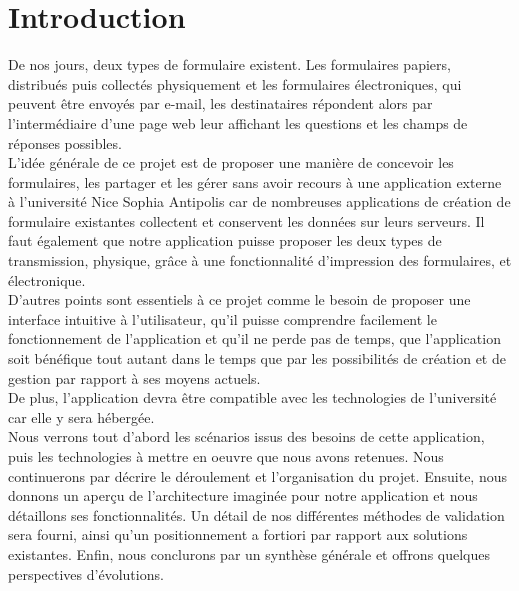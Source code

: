 \documentclass{sigplanconf}
\begin{document}
\section{Introduction}
De nos jours, deux types de formulaire existent. Les formulaires papiers, distribués puis collectés physiquement et les formulaires électroniques, qui peuvent être envoyés par e-mail, les destinataires répondent alors par l’intermédiaire d’une page web leur affichant les questions et les champs de réponses possibles.\\
L’idée générale de ce projet est de proposer une manière de concevoir les formulaires, les partager et les gérer sans avoir recours à une application externe à l’université Nice Sophia Antipolis car de nombreuses applications de création de formulaire existantes collectent et conservent les données sur leurs serveurs. Il faut également que notre application puisse proposer les deux types de transmission, physique, grâce à une fonctionnalité d’impression des formulaires, et électronique.\\
D’autres points sont essentiels à ce projet comme le besoin de proposer une interface intuitive à l’utilisateur, qu’il puisse comprendre facilement le fonctionnement de l’application et qu’il ne perde pas de temps, que l’application soit bénéfique tout autant dans le temps que par les possibilités de création et de gestion par rapport à ses moyens actuels. \\
De plus, l’application devra être compatible avec les technologies de l’université car elle y sera hébergée.\\

Nous verrons tout d'abord les scénarios issus des besoins de cette application, puis les technologies à mettre en oeuvre que nous avons retenues. Nous continuerons par décrire le déroulement et l'organisation du projet. Ensuite, nous donnons un aperçu de l'architecture imaginée pour notre application et nous détaillons ses fonctionnalités. Un détail de nos différentes méthodes de validation sera fourni, ainsi qu'un positionnement a fortiori par rapport aux solutions existantes. Enfin, nous conclurons par un synthèse générale et offrons quelques perspectives d'évolutions.


\end{document}
